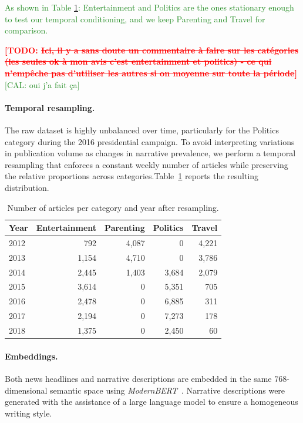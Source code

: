 \documentclass[
  journal=medium,
  manuscript=article-type,
  year=2025,
  volume=1,
]{cup-journal}
\newcommand{\TODO}[1]{\textcolor{red}{\textbf{[TODO: #1]}}}
\begin{document}
\textcolor{ForestGreen}{As shown in Table \ref{tab:resampled}: Entertainment and Politics are the ones stationary enough to test our temporal conditioning, and we keep Parenting and Travel for comparison.}


\TODO{\st{Ici, il y a sans doute un commentaire à faire sur les catégories (les seules ok à mon avis c'est entertainment et politics) - ce qui n'empêche pas d'utiliser les autres si on moyenne sur toute la période}}\textcolor{ForestGreen}{[CAL: oui j'a fait ça]}


\paragraph{Temporal resampling.}
The raw dataset is highly unbalanced over time, particularly for the Politics category during the 2016 presidential campaign. To avoid interpreting variations in publication volume as changes in narrative prevalence, we perform a temporal resampling that enforces a constant weekly number of articles while preserving the relative proportions across categories.Table~\ref{tab:resampled} reports the resulting distribution.

\begin{table}[hbt!]
\begin{threeparttable}
\caption{Number of articles per category and year after resampling.}
\label{tab:resampled}
\begin{tabular}{lrrrr}
\toprule
\headrow Year & Entertainment & Parenting & Politics & Travel \\
\midrule
2012 &   792 & 4{,}087 &         0 & 4{,}221 \\
2013 & 1{,}154 & 4{,}710 &         0 & 3{,}786 \\
2014 & 2{,}445 & 1{,}403 & 3{,}684 & 2{,}079 \\
2015 & 3{,}614 &         0 & 5{,}351 &    705 \\
2016 & 2{,}478 &         0 & 6{,}885 &    311 \\
2017 & 2{,}194 &         0 & 7{,}273 &    178 \\
2018 & 1{,}375 &         0 & 2{,}450 &     60 \\
\bottomrule
\end{tabular}
\end{threeparttable}
\end{table}


\paragraph{Embeddings.}
Both news headlines and narrative descriptions are embedded in the same $768$-dimensional semantic space using \emph{ModernBERT}~\autocite{warner2024modernbert}. Narrative descriptions were generated with the assistance of a large language model to ensure a homogeneous writing style.
\end{document}
